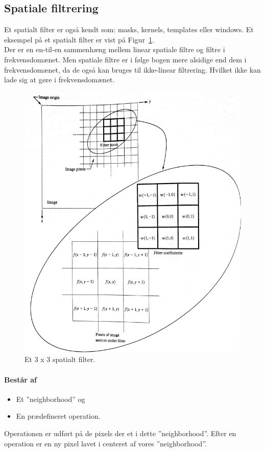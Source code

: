 \subsection{Spatiale filtrering}
Et spatialt filter er også kendt som: masks, kernels, templates eller windows. Et eksempel på et spatialt filter er vist på Figur~\ref{fig:spatial-filter}.\\

Der er en en-til-en sammenhæng mellem linear spatiale filtre og filtre i frekvensdomænet. Men spatiale filtre er i følge bogen mere alsidige end dem i frekvensdomænet, da de også kan bruges til ikke-linear filtrering. Hvilket ikke kan lade sig at gøre i frekvensdomænet.

\begin{figure}[H]
	\centering
	\includegraphics[width=0.8\linewidth]{figs/spm02/spatial-filter}
	\caption{Et 3 x 3 spatialt filter.}
	\label{fig:spatial-filter}
\end{figure}

\paragraph{Består af}

\begin{itemize}
	\item Et ''neighborhood'' og 
	\item En prædefineret operation.
\end{itemize}

Operationen er udført på de pixels der et i dette ''neighborhood''. Efter en operation er en ny pixel lavet i centeret af vores ''neighborhood''.